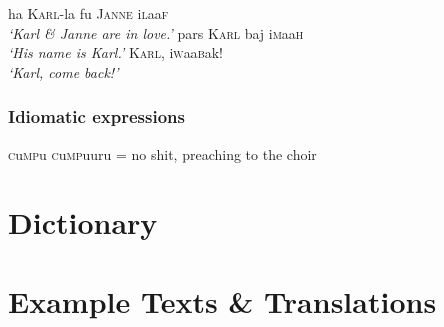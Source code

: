 \documentclass[a4paper,10pt,twoside,openright]{memoir}
\newcommand{\famwordold}[5]{#1\textsc{#2}#3\textsc{#4}#5}
\begin{document}
\pex
\a
ha \textsc{Karl}-la fu \textsc{Janne} \famwordold{i}{l}{aa}{f}{}\\
\textit{`Karl \& Janne are in love.'}
\a
pars \textsc{Karl} baj \famwordold{i}{m}{aa}{h}{}\\
\textit{`His name is Karl.'}
\a
\textsc{Karl}, \famwordold{i}{w}{aa}{b}{ak}!\\
\textit{`Karl, come back!'}
\xe


\section{Idiomatic expressions}

\famwordold{}{c}{u}{mp}{u} \famwordold{}{c}{u}{mp}{uuru} = no shit, preaching to the choir

\part{Dictionary}



\part{Example Texts \& Translations}

\end{document}
